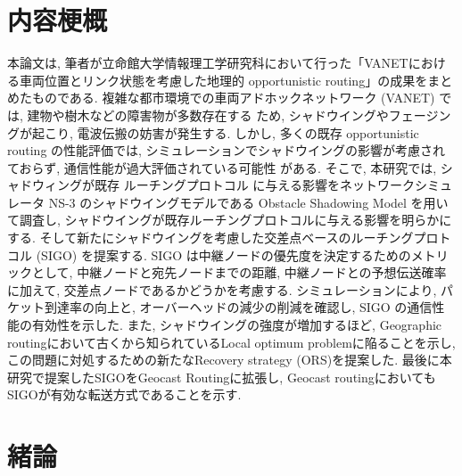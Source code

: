 \documentclass[10pt]{jreport}
\begin{document}
\maketitle


\renewcommand{\thepage}{\roman{page}}
\setcounter{page}{1}
\chapter*{内容梗概}
本論文は, 筆者が立命館大学情報理工学研究科において行った「VANETにおける車両位置とリンク状態を考慮した地理的
opportunistic routing」の成果をまとめたものである.
複雑な都市環境での車両アドホックネットワーク (VANET) では, 建物や樹木などの障害物が多数存在する
ため, シャドウイングやフェージングが起こり, 電波伝搬の妨害が発生する. しかし, 多くの既存 opportunistic routing の性能評価では, シミュレーションでシャドウイングの影響が考慮されておらず, 通信性能が過大評価されている可能性
がある. そこで, 本研究では, シャドウィングが既存 ルーチングプロトコル に与える影響をネットワークシミュレータ
NS-3 のシャドウイングモデルである Obstacle Shadowing Model を用いて調査し, シャドウイングが既存ルーチングプロトコルに与える影響を明らかにする. そして新たにシャドウイングを考慮した交差点ベースのルーチングプロトコル (SIGO) を提案する. SIGO は中継ノードの優先度を決定するためのメトリックとして, 中継ノードと宛先ノードまでの距離, 中継ノードとの予想伝送確率に加えて, 交差点ノードであるかどうかを考慮する. シミュレーションにより,
パケット到達率の向上と, オーバーヘッドの減少の削減を確認し, SIGO の通信性能の有効性を示した. また, シャドウイングの強度が増加するほど, Geographic routingにおいて古くから知られているLocal optimum problemに陥ることを示し, この問題に対処するための新たなRecovery strategy (ORS)を提案した. 最後に本研究で提案したSIGOをGeocast Routingに拡張し, Geocast routingにおいてもSIGOが有効な転送方式であることを示す. 


\newpage
\pagestyle{myheadings}
\renewcommand{\thepage}{\roman{page}}
\tableofcontents


\newpage
\renewcommand{\thepage}{\arabic{page}}
\setcounter{page}{1}
\chapter{緒論}
\vspace{-5mm}
\end{document}
